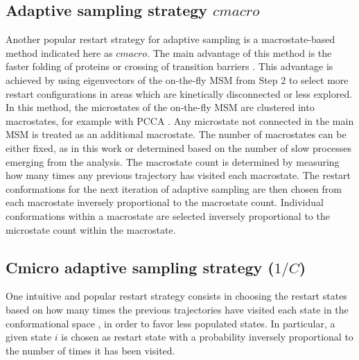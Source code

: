 \subsection{\label{sec:macro}Adaptive sampling strategy $cmacro$} 
Another popular restart strategy for adaptive sampling is a macrostate-based
method indicated here as $cmacro$. The main advantage of this
method is the faster folding of proteins or crossing of transition barriers
\cite{Adstrategies2018}. This advantage is achieved by using eigenvectors of
the on-the-fly MSM from Step 2 to select more restart configurations in areas which are
kinetically disconnected or less explored. In this method, the microstates of
the on-the-fly MSM are clustered into macrostates, for
example with PCCA \cite{roblitz2013fuzzy}. Any microstate not connected in the
main MSM is treated as an additional macrostate. The number of macrostates can
be either fixed, as in this work or determined based on the number of
slow processes emerging from the analysis. The macrostate count is determined by
measuring how many times any previous trajectory has visited each macrostate.
The restart conformations for the next iteration of adaptive sampling are then
chosen from each macrostate inversely proportional to the macrostate count.
Individual conformations within a macrostate are selected inversely
proportional to the microstate count within the macrostate.


\subsection{Cmicro adaptive sampling strategy ($1/C$)}
One intuitive and popular restart strategy consists in choosing the restart
states based on how many times the previous trajectories have visited each state
in the conformational space
\cite{weber2011characterization, Fabritiis-2014, AdaptivePELE-Lecina2017}, in
order to favor less populated states.  In particular, a
given state $i$ is chosen as restart state with a probability inversely
proportional to the number of times it has been visited.


